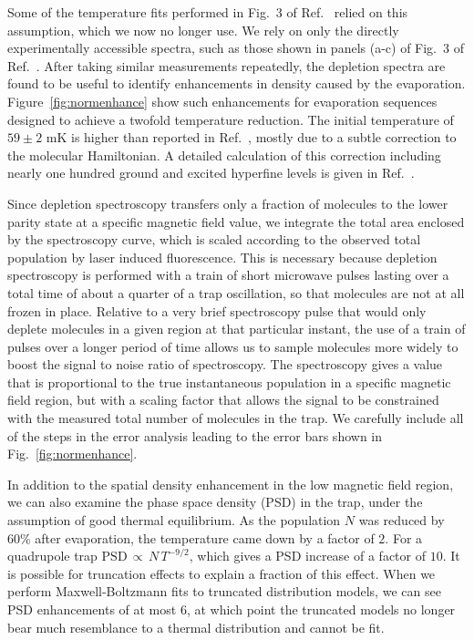 \documentclass[%
 reprint,
 amsmath,amssymb,
 aps,
pra,
]{revtex4-1}
\begin{document}
Some of the temperature fits performed in Fig.~3 of Ref.~\cite{Stuhl2012evap} relied on this assumption, which we now no longer use. We rely on only the directly experimentally accessible spectra, such as those shown in panels (a-c) of Fig.~3 of Ref.~\cite{Stuhl2012evap}. After taking similar measurements repeatedly, the depletion spectra are found to be useful to identify enhancements in density caused by the evaporation. Figure~\ref{fig:normenhance} show such enhancements for evaporation sequences designed to achieve a twofold temperature reduction. The initial temperature of $59\pm2\text{ mK}$ is higher than reported in Ref.~\cite{Stuhl2012evap}, mostly due to a subtle correction to the molecular Hamiltonian.  A detailed calculation of this correction including nearly one hundred ground and excited hyperfine levels is given in Ref.~\cite{Maeda2015}.

Since depletion spectroscopy transfers only a fraction of molecules to the lower parity state at a specific magnetic field value, we integrate the total area enclosed by the spectroscopy curve, which is scaled according to the observed total population by laser induced fluorescence.  
This is necessary because depletion spectroscopy is performed with a train of short microwave pulses lasting over a total time of about a quarter of a trap oscillation, so that molecules are not at all frozen in place. 
Relative to a very brief spectroscopy pulse that would only deplete molecules in a given region at that particular instant, the use of a train of pulses over a longer period of time allows us to sample molecules more widely to boost the signal to noise ratio of spectroscopy. 
The spectroscopy gives a value that is proportional to the true instantaneous population in a specific magnetic field region, but with a scaling factor that allows the signal to be constrained with the measured total number of molecules in the trap. 
We carefully include all of the steps in the error analysis leading to the error bars shown in Fig.~\ref{fig:normenhance}.

In addition to the spatial density enhancement in the low magnetic field region, we can also examine the phase space density (PSD) in the trap, under the assumption of good thermal equilibrium. 
As the population $N$ was reduced by $60\%$ after evaporation, the temperature came down by a factor of $2$. 
For a quadrupole trap $\text{PSD}\,{\propto}\,N\,T^{-9/2}$, which gives a PSD increase of a factor of $10$. 
It is possible for truncation effects to explain a fraction of this effect.
When we perform Maxwell-Boltzmann fits to truncated distribution models, we can see PSD enhancements of at most $6$, at which point the truncated models no longer bear much resemblance to a thermal distribution and cannot be fit.
\end{document}
